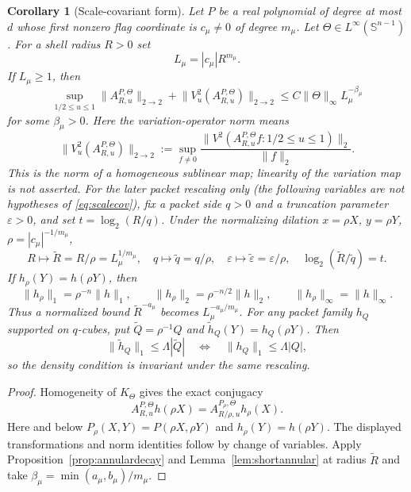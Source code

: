 \documentclass[11pt]{article}
\numberwithin{equation}{section}
\newtheorem{corollary}[theorem]{Corollary}
\theoremstyle{remark}
\theoremstyle{definition}
\newcommand{\Sph}{\mathbb S}
\newcommand{\norm}[1]{\lVert #1\rVert}
\begin{document}
\begin{corollary}[Scale-covariant form]\label{cor:scalecov}
Let $P$ be a real polynomial of degree at most $d$ whose first nonzero flag
coordinate is $c_\mu\ne0$ of degree $m_\mu$.
Let $\Theta\in L^\infty(\Sph^{n-1})$.  For a shell radius $R>0$ set
\[
 L_\mu=|c_\mu|R^{m_\mu}.
\]
If $L_\mu\ge1$, then
\begin{equation}\label{eq:scalecov}
 \sup_{1/2\le u\le1}\norm{A^{P,\Theta}_{R,u}}_{2\to2}
 +\norm{V^2_u(A^{P,\Theta}_{R,u})}_{2\to2}
 \le C\norm\Theta_\infty L_\mu^{-\beta_\mu}
\end{equation}
for some $\beta_\mu>0$.  Here the variation-operator norm means
\begin{equation}\label{eq:nonlinear-variation-operator-norm}
 \norm{V_u^2(A^{P,\Theta}_{R,u})}_{2\to2}
 :=\sup_{f\ne0}
 \frac{\norm{V^2(A^{P,\Theta}_{R,u}f:1/2\le u\le1)}_2}{\norm f_2}.
\end{equation}
This is the norm of a homogeneous sublinear map; linearity of the
variation map is not asserted.  For the later packet rescaling only (the
following variables are not hypotheses of \eqref{eq:scalecov}), fix a
packet side $q>0$ and a truncation parameter $\varepsilon>0$, and set
$t=\log_2(R/q)$.  Under the normalizing dilation
$x=\rho X$, $y=\rho Y$, $\rho=|c_\mu|^{-1/m_\mu}$,
\begin{equation}\label{eq:scalevariables}
 R\mapsto\widetilde R=R/\rho=L_\mu^{1/m_\mu},\quad
 q\mapsto\widetilde q=q/\rho,\quad
 \varepsilon\mapsto\widetilde\varepsilon=\varepsilon/\rho,
 \quad \log_2(\widetilde R/\widetilde q)=t.
\end{equation}
If $h_\rho(Y)=h(\rho Y)$, then
\begin{equation}\label{eq:scalenorms}
 \norm{h_\rho}_1=\rho^{-n}\norm h_1,
 \qquad \norm{h_\rho}_2=\rho^{-n/2}\norm h_2,
 \qquad \norm{h_\rho}_\infty=\norm h_\infty.
\end{equation}
Thus a normalized bound $\widetilde R^{-a_\mu}$ becomes
$L_\mu^{-a_\mu/m_\mu}$.  For any packet family $h_Q$ supported on
$q$-cubes, put $\widetilde Q=\rho^{-1}Q$ and
$\widetilde h_Q(Y)=h_Q(\rho Y)$.  Then
\[
 \norm{\widetilde h_Q}_1\le\Lambda|\widetilde Q|
 \quad\Longleftrightarrow\quad
 \norm{h_Q}_1\le\Lambda|Q|,
\]
so the density condition is invariant under the same rescaling.
\end{corollary}

\begin{proof}
Homogeneity of $K_\Theta$ gives the exact conjugacy
\[
 A^{P,\Theta}_{R,u}h(\rho X)
 =A^{P_\rho,\Theta}_{R/\rho,u}h_\rho(X).
\]
Here and below
\(P_\rho(X,Y)=P(\rho X,\rho Y)\) and
\(h_\rho(Y)=h(\rho Y)\).
The displayed transformations and norm identities follow by change of
variables.  Apply Proposition~\ref{prop:annulardecay} and
Lemma~\ref{lem:shortannular} at radius $\widetilde R$ and take
$\beta_\mu=\min(a_\mu,b_\mu)/m_\mu$.
\end{proof}
\end{document}
